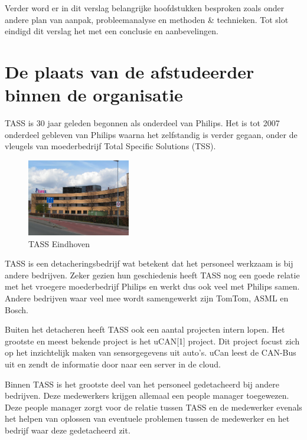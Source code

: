 \documentclass[]{article}
\begin{document}
Verder word er in dit verslag belangrijke hoofdstukken besproken zoals onder andere
plan van aanpak, probleemanalyse en methoden \& technieken.
Tot slot eindigd dit verslag het met een conclusie en aanbevelingen.

\newpage
\section{De plaats van de afstudeerder binnen de organisatie}

TASS is 30 jaar geleden begonnen als onderdeel van Philips. Het is tot 2007
onderdeel gebleven van Philips waarna het zelfstandig is verder gegaan,
onder de vleugels van moederbedrijf Total Specific Solutions (TSS).

\begin{figure}
  \begin{center}
    \includegraphics[width=0.40\textwidth]{tass_eindhoven.pdf}
  \end{center}
  \caption{TASS Eindhoven}
\end{figure}

TASS is een detacheringsbedrijf wat betekent dat het personeel werkzaam is bij
andere bedrijven. Zeker gezien hun geschiedenis heeft TASS nog een goede
relatie met het vroegere moederbedrijf Philips en werkt dus ook veel met Philips
samen. Andere bedrijven waar veel mee wordt samengewerkt zijn TomTom, ASML
en Bosch.

Buiten het detacheren heeft TASS ook een aantal projecten intern lopen. Het
grootste en meest bekende project is het uCAN[1] project. Dit project
focust zich op het inzichtelijk maken van sensorgegevens uit auto's. uCan
leest de CAN-Bus uit en zendt de informatie door naar een server in de
cloud.

Binnen TASS is het grootste deel van het personeel gedetacheerd bij andere
bedrijven. Deze medewerkers krijgen allemaal een people manager toegewezen.
Deze people manager zorgt voor de relatie tussen TASS en de medewerker evenals
het helpen van oplossen van eventuele problemen tussen de medewerker en het bedrijf waar deze
gedetacheerd zit.
\end{document}
